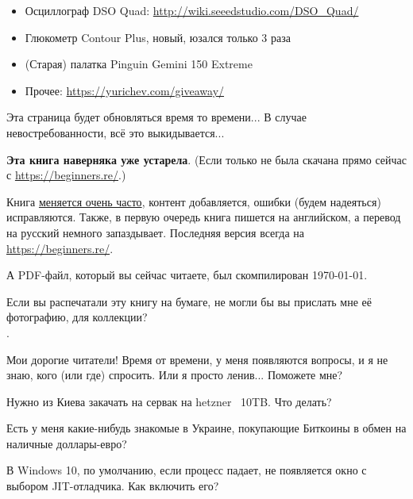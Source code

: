 \begin{itemize}
        \item Осциллограф DSO Quad: \url{http://wiki.seeedstudio.com/DSO_Quad/}
        \item Глюкометр Contour Plus, новый, юзался только 3 раза

        \item (Старая) палатка Pinguin Gemini 150 Extreme
        \item Прочее: \url{https://yurichev.com/giveaway/}

        \end{itemize}

Эта страница будет обновляться время то времени...
В случае невостребованности, всё это выкидывается...
\fi

        \myhrule{}

\textbf{Эта книга наверняка уже устарела}.
(Если только не была скачана прямо сейчас с \url{https://beginners.re/}.)

Книга \href{\RepoURL/ChangeLog}{меняется очень часто},
контент добавляется, ошибки (будем надеяться) исправляются.
Также, в первую очередь книга пишется на английском, а перевод на русский немного запаздывает.
Последняя версия всегда на \url{https://beginners.re/}.

А PDF-файл, который вы сейчас читаете, был скомпилирован \today{}.

\myhrule{}

Если вы распечатали эту книгу на бумаге, не могли бы вы прислать мне её фотографию, для коллекции?\\
\EMAILS{}.

\myhrule{}

Мои дорогие читатели! Время от времени, у меня появляются вопросы, и я не знаю, кого (или где) спросить.
Или я просто ленив...
Поможете мне?

\myhrule{}

Нужно из Киева закачать на сервак на hetzner ~10TB. Что делать?

\myhrule{}

Есть у меня какие-нибудь знакомые в Украине, покупающие Биткоины в обмен на наличные доллары-евро?

\myhrule{}

В Windows 10, по умолчанию, если процесс падает, не появляется окно с выбором JIT-отладчика.
Как включить его?

